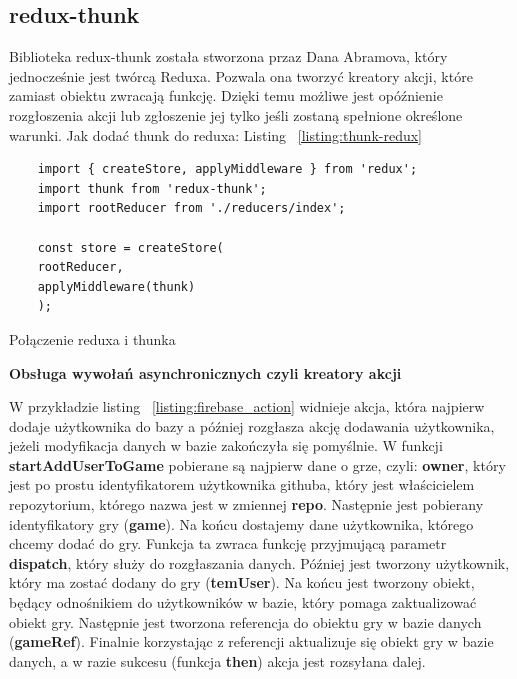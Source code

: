 \subsection{redux-thunk}

Biblioteka redux-thunk została stworzona przaz Dana Abramova,
który jednocześnie jest twórcą Reduxa. Pozwala ona tworzyć kreatory akcji,
które zamiast obiektu zwracają funkcję.
Dzięki temu możliwe jest opóźnienie rozgłoszenia akcji lub zgłoszenie jej tylko jeśli zostaną spełnione określone warunki.\cite{www_thunk}
Jak dodać thunk do reduxa: Listing 
~\ref{listing:thunk-redux}

\begin{listing}
	\begin{verbatim}
	import { createStore, applyMiddleware } from 'redux';
	import thunk from 'redux-thunk';
	import rootReducer from './reducers/index';
	
	const store = createStore(
	rootReducer,
	applyMiddleware(thunk)
	);
	\end{verbatim}
	\caption{Połączenie reduxa i thunka} \label{listing:thunk-redux}
\end{listing}

\newpage

\begin{center}
	\textbf{Obsługa wywołań asynchronicznych czyli kreatory akcji}
\end{center}

W przykładzie listing 
~\ref{listing:firebase_action} widnieje akcja,
która najpierw dodaje użytkownika do bazy a później rozgłasza akcję dodawania użytkownika,
jeżeli modyfikacja danych w bazie zakończyła się pomyślnie.
W funkcji \textbf{startAddUserToGame} pobierane są najpierw dane o grze, czyli: \textbf{owner},
który jest po prostu identyfikatorem użytkownika githuba,
który jest właścicielem repozytorium, którego nazwa jest w zmiennej \textbf{repo}.
Następnie jest pobierany identyfikatory gry (\textbf{game}).
Na końcu dostajemy dane użytkownika, którego chcemy dodać do gry.
Funkcja ta zwraca funkcję przyjmującą parametr \textbf{dispatch},
który służy do rozgłaszania danych.
Później jest tworzony użytkownik, który ma zostać dodany do gry (\textbf{temUser}).
Na końcu jest tworzony obiekt, będący odnośnikiem do użytkowników w bazie,
który pomaga zaktualizować obiekt gry.
Następnie jest tworzona referencja do obiektu gry w bazie danych (\textbf{gameRef}).
Finalnie korzystając z referencji aktualizuje się obiekt gry w bazie danych,
 a w razie sukcesu (funkcja \textbf{then}) akcja jest rozsyłana dalej.

